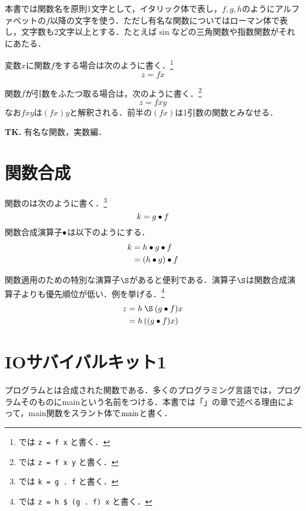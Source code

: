 \documentclass[platex,a5paper,twoside,fleqn,draft]{jsbook}
\newcommand{\keyword}[1]{\textgt{\textbf{#1}}}
\newcommand{\tobewritten}[1]{\begin{screen}\textbf{TK.} {#1}\end{screen}}
\begin{document}
本書では関数名を原則1文字として，イタリック体で表し，$f,g,h$のようにアルファベットの$f$以降の文字を使う．ただし有名な関数についてはローマン体で表し，文字数も2文字以上とする．たとえば$\sin$などの三角関数や指数関数がそれにあたる．

変数$x$に関数$f$を\keyword{適用}する場合は次のように書く．\footnote{\haskell では \verb|z = f x| と書く．}
\begin{equation}
z=fx
\end{equation}

関数$f$が引数をふたつ取る場合は，次のように書く．\footnote{\haskell では \verb|z = f x y| と書く．}
\begin{equation}
z=fxy
\end{equation}
なお$fxy$は$(fx)y$と解釈される．前半の$(fx)$は1引数の関数とみなせる．

\tobewritten{有名な関数，実数編．}

\section{関数合成}

関数の\keyword{合成}は次のように書く．\footnote{\haskell では \verb|k = g . f| と書く．}
\begin{equation}
k=g\mathbin{\bullet} f
\end{equation}
関数合成演算子$\mathbin{\bullet}$は以下のように\keyword{左結合}する．
\begin{align}
k&=h\mathbin{\bullet} g\mathbin{\bullet} f\\
&=\left(h\mathbin{\bullet} g\right)\mathbin{\bullet} f\\
\end{align}

関数適用のための特別な演算子$\mathApply$があると便利である．演算子$\mathApply$は関数合成演算子よりも優先順位が低い．例を挙げる．\footnote{\haskell では \verb|z = h $ (g . f) x| と書く．}
\begin{align}
z&=h\mathApply(g\mathCompose f)x\\
&=h\left((g\mathCompose f)x\right)
\end{align}

\section{IOサバイバルキット1}

プログラムとは合成された関数である．多くのプログラミング言語では，プログラムそのものにmainという名前をつける．本書では「\keyword{IOモナド}」の章で述べる理由によって，main関数をスラント体で$\mathord{\textsl{main}}$と書く．
\end{document}
